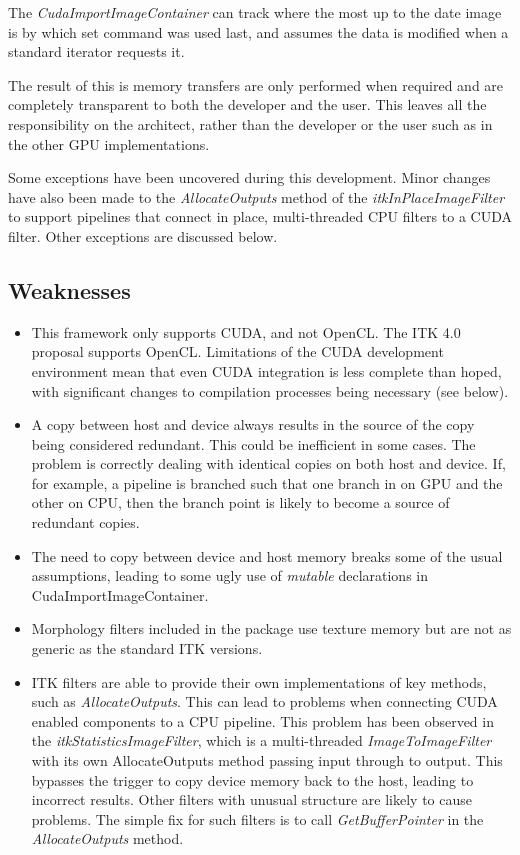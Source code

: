 \documentclass{InsightArticle}
\begin{document}
The {\em CudaImportImageContainer} can track where the most up to the
date image is by which set command was used last, and assumes the data
is modified when a standard iterator requests it.

The result of this is memory transfers are only performed when
required and are completely transparent to both the developer and the
user. This leaves all the responsibility on the architect, rather than
the developer or the user such as in the other GPU implementations.

Some exceptions have been uncovered during this development. Minor
changes have also been made to the {\em AllocateOutputs} method of the
{\em itkInPlaceImageFilter} to support pipelines that connect in
place, multi-threaded CPU filters to a CUDA filter. Other exceptions
are discussed below.

\subsection{Weaknesses}
\begin{itemize}
\item This framework only supports CUDA, and not OpenCL. The ITK 4.0
proposal supports OpenCL. Limitations of the CUDA development
environment mean that even CUDA integration is less complete than
hoped, with significant changes to compilation processes being
necessary (see below).
\item A copy between host and device always results in the source of
the copy being considered redundant. This could be inefficient in some
cases. The problem is correctly dealing with identical copies on both
host and device. If, for example, a pipeline is branched such that one
branch in on GPU and the other on CPU, then the branch point is likely
to become a source of redundant copies.
\item The need to copy between device and host memory breaks some of
the usual assumptions, leading to some ugly use of {\em mutable}
declarations in CudaImportImageContainer.
\item Morphology filters included in the package use texture memory
but are not as generic as the standard ITK versions.
\item ITK filters are able to provide their own implementations of key
methods, such as {\em AllocateOutputs}. This can lead to problems when
connecting CUDA enabled components to a CPU pipeline. This problem has
been observed in the {\em itkStatisticsImageFilter}, which is a
multi-threaded {\em ImageToImageFilter} with its own AllocateOutputs
method passing input through to output. This bypasses the trigger to
copy device memory back to the host, leading to incorrect
results. Other filters with unusual structure are likely to cause
problems. The simple fix for such filters is to call {\em
  GetBufferPointer} in the {\em AllocateOutputs} method.
\end{itemize}
\end{document}
